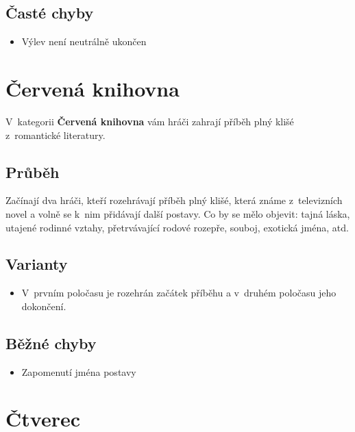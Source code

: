 \subsection{ Časté chyby } \begin{itemize}
\item  Výlev není neutrálně ukončen
\end{itemize}
 
 
 
 
 
\needspace{5cm} \section{Červená knihovna} \label{červená knihovna}  
 
 
V~kategorii \textbf{Červená knihovna} vám hráči zahrají příběh plný klišé z~romantické literatury. 
 
 
\subsection{Průběh} Začínají dva hráči, kteří rozehrávají příběh plný klišé, která známe z~televizních novel a volně se k~nim přidávají další postavy. Co by se mělo objevit: tajná láska, utajené rodinné vztahy, přetrvávající rodové rozepře, souboj, exotická jména, atd. 
 
\subsection{ Varianty } \begin{itemize}
\item V~prvním poločasu je rozehrán začátek příběhu a v~druhém poločasu jeho dokončení.
\end{itemize}
 
 
\subsection{ Běžné chyby } \begin{itemize}
\item Zapomenutí jména postavy
\end{itemize}
 
 
 
 
 
\needspace{5cm} \section{Čtverec} \label{čtverec}  
 
